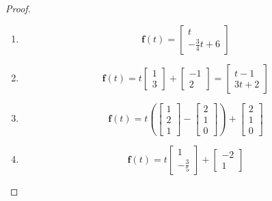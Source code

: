 \begin{exercise}
    \begin{proof}
        \begin{enumerate}
            \item \[ \mathbf{f}(t) = \begin{bmatrix} t \\ -\frac{3}{4} t + 6 \end{bmatrix} \]
            
            \item \[ \mathbf{f}(t) = t \begin{bmatrix} 1 \\ 3 \end{bmatrix} + \begin{bmatrix} -1 \\ 2 \end{bmatrix} = \begin{bmatrix} t-1 \\ 3t+2 \end{bmatrix} \]
            
            \item \[ \mathbf{f}(t) = t \left( \begin{bmatrix} 1 \\ 2 \\ 1 \end{bmatrix} - \begin{bmatrix} 2 \\ 1 \\ 0 \end{bmatrix} \right) + \begin{bmatrix} 2 \\ 1 \\ 0 \end{bmatrix} \]
            
            \item \[ \mathbf{f}(t) = t \begin{bmatrix} 1 \\ -\frac{3}{5} \end{bmatrix} + \begin{bmatrix} -2 \\ 1 \end{bmatrix} \]
            

\end{enumerate}
\end{proof}
\end{exercise}
